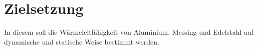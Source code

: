 \section{Zielsetzung}
\label{sec:Zielsetzung}
In diesem soll die Wärmeleitfähigkeit von Aluminium, Messing und Edelstahl 
auf dynamische und statische Weise bestimmt werden.
